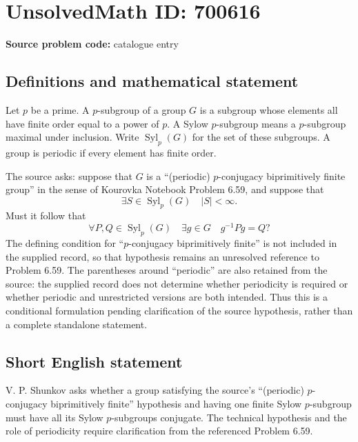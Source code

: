 \documentclass[11pt]{article}
\begin{document}
\section*{UnsolvedMath ID: 700616}
\textbf{Source problem code:} catalogue entry
\subsection{Definitions and mathematical statement}
Let \(p\) be a prime. A \(p\)-subgroup of a group \(G\) is a subgroup whose elements all have finite order equal to a power of \(p\). A Sylow \(p\)-subgroup means a \(p\)-subgroup maximal under inclusion. Write \(\operatorname{Syl}_p(G)\) for the set of these subgroups. A group is periodic if every element has finite order.

The source asks: suppose that \(G\) is a ``(periodic) \(p\)-conjugacy biprimitively finite group'' in the sense of Kourovka Notebook Problem 6.59, and suppose that
\[
\exists S\in\operatorname{Syl}_p(G)\quad |S|<\infty.
\]
Must it follow that
\[
\forall P,Q\in\operatorname{Syl}_p(G)\quad
\exists g\in G\quad g^{-1}Pg=Q?
\]
The defining condition for ``\(p\)-conjugacy biprimitively finite'' is not included in the supplied record, so that hypothesis remains an unresolved reference to Problem 6.59. The parentheses around ``periodic'' are also retained from the source: the supplied record does not determine whether periodicity is required or whether periodic and unrestricted versions are both intended. Thus this is a conditional formulation pending clarification of the source hypothesis, rather than a complete standalone statement.
\subsection{Short English statement}
V. P. Shunkov asks whether a group satisfying the source's ``(periodic) \(p\)-conjugacy biprimitively finite'' hypothesis and having one finite Sylow \(p\)-subgroup must have all its Sylow \(p\)-subgroups conjugate. The technical hypothesis and the role of periodicity require clarification from the referenced Problem 6.59.
\end{document}

